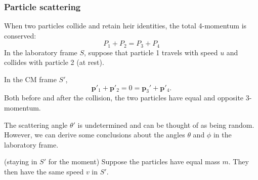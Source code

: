 \documentclass[a4paper]{article}
\begin{document}
\subsubsection*{Particle scattering}
When two particles collide and retain heir identities, the total 4-momentum is conserved:
\[
  P_1 + P_2 = P_3 + P_4
\]
In the laboratory frame $S$, suppose that particle 1 travels with speed $u$ and collides with particle 2 (at rest).
\begin{center}
\end{center}
In the CM frame $S'$,
\[
  \mathbf{p}'_1 + \mathbf{p}'_2 = 0 = \mathbf{p}_3' + \mathbf{p}'_4.
\]
Both before and after the collision, the two particles have equal and opposite 3-momentum.
\begin{center}
\end{center}
The scattering angle $\theta'$ is undetermined and can be thought of as being random. However, we can derive some conclusions about the angles $\theta$ and $\phi$ in the laboratory frame.

(staying in $S'$ for the moment) Suppose the particles have equal mass $m$. They then have the same speed $v$ in $S'$.
\end{document}
